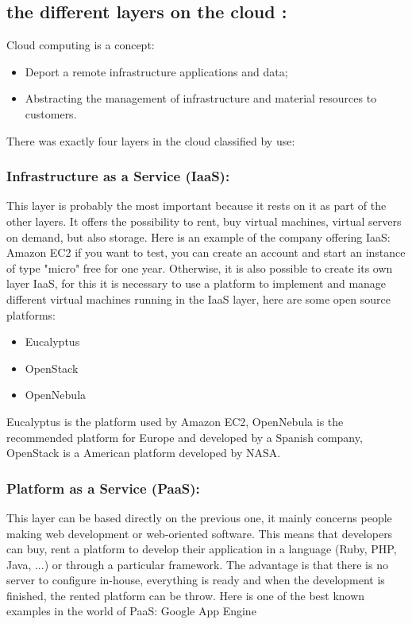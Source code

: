 \subsection{the different layers on the cloud :}

Cloud computing is a concept:
\begin{itemize}
 \item Deport a remote infrastructure applications and data;
 \item Abstracting the management of infrastructure and material resources to customers.
\end{itemize}
 There was exactly four layers in the cloud classified by use:

\subsubsection{Infrastructure as a Service (IaaS):}

This layer is probably the most important because it rests on it as part of the other layers. It offers the possibility to rent, 
buy virtual machines, virtual servers on demand, but also storage.
Here is an example of the company offering IaaS: Amazon EC2 if you want to test, you can create an account and start an instance of type "micro" free for one year.
Otherwise, it is also possible to create its own layer IaaS, 
for this it is necessary to use a platform to implement and manage different virtual machines running in the IaaS layer, here are some open source platforms:

\begin {itemize}
 \item [•]Eucalyptus
 \item [•]OpenStack
 \item [•]OpenNebula
\end {itemize}

Eucalyptus is the platform used by Amazon EC2, OpenNebula is the recommended platform for Europe and developed by a Spanish company, 
OpenStack is a American platform developed by NASA.


\subsubsection{Platform as a Service (PaaS):}

This layer can be based directly on the previous one, it mainly concerns people making web development 
or web-oriented software. This means that developers can buy, rent a platform to develop their application in a language (Ruby, PHP, Java, ...)
 or through a particular framework.
The advantage is that there is no server to configure in-house, everything is ready and when the development is finished, the rented platform can be throw.
Here is one of the best known examples in the world of PaaS: Google App Engine


